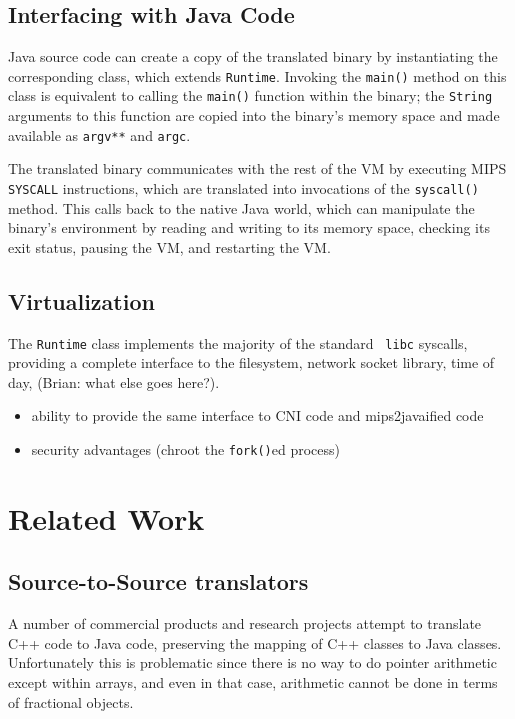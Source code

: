 \documentclass{acmconf}
\begin{document}
\subsection{Interfacing with Java Code}

Java source code can create a copy of the translated binary by
instantiating the corresponding class, which extends {\tt Runtime}.
Invoking the {\tt main()} method on this class is equivalent to
calling the {\tt main()} function within the binary; the {\tt String}
arguments to this function are copied into the binary's memory space
and made available as {\tt argv**} and {\tt argc}.

The translated binary communicates with the rest of the VM by
executing MIPS {\tt SYSCALL} instructions, which are translated into
invocations of the {\tt syscall()} method.  This calls back to the
native Java world, which can manipulate the binary's environment by
reading and writing to its memory space, checking its exit status,
pausing the VM, and restarting the VM.


\subsection{Virtualization}

The {\tt Runtime} class implements the majority of the standard {\tt
libc} syscalls, providing a complete interface to the filesystem,
network socket library, time of day, (Brian: what else goes here?).

\begin{itemize}
\item ability to provide the same interface to CNI code and mips2javaified code
\item security advantages (chroot the {\tt fork()}ed process)
\end{itemize}

\section{Related Work}

\subsection{Source-to-Source translators}

A number of commercial products and research projects attempt to
translate C++ code to Java code, preserving the mapping of C++ classes
to Java classes.  Unfortunately this is problematic since there is no
way to do pointer arithmetic except within arrays, and even in that
case, arithmetic cannot be done in terms of fractional objects.
\end{document}
